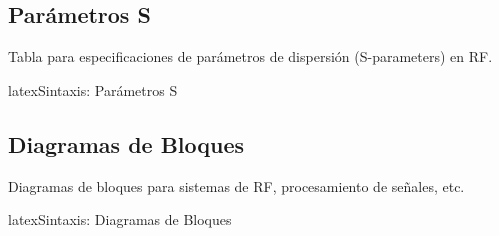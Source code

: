 \begin{protocolframe}[16]
\end{protocolframe}

\subsection{Parámetros S}
\label{subsec:sparams}

Tabla para especificaciones de parámetros de dispersión (S-parameters) en RF.

\begin{codigosimple}{latex}{Sintaxis: Parámetros S}
\begin{rfspecs}[Título]
\end{rfspecs}
\end{codigosimple}

\begin{rfspecs}[Parámetros S]
\end{rfspecs}

\subsection{Diagramas de Bloques}
\label{subsec:bloques}

Diagramas de bloques para sistemas de RF, procesamiento de señales, etc.

\begin{codigosimple}{latex}{Sintaxis: Diagramas de Bloques}
\begin{blockdiagram}
\end{blockdiagram}
\end{codigosimple}

\begin{blockdiagram}
\end{blockdiagram}

